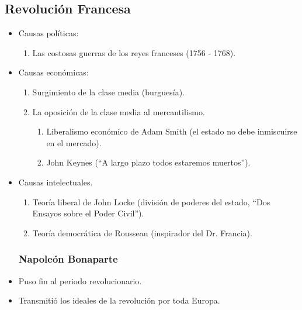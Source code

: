 \subsection{Revolución Francesa}

\begin{itemize}

\item Causas políticas:
\begin{enumerate}
	\item Las costosas guerras de los reyes franceses (1756 - 1768).
\end{enumerate}

\item Causas económicas:
\begin{enumerate}
	\item Surgimiento de la clase media (burguesía).
	\item La oposición de la clase media al mercantilismo.
	\begin{enumerate}
		\item Liberalismo económico de Adam Smith (el estado no debe inmiscuirse en el mercado).
		\item John Keynes (``A largo plazo todos estaremos muertos'').
	\end{enumerate}
\end{enumerate}

\item Causas intelectuales.
\begin{enumerate}
	\item Teoría liberal de John Locke (división de poderes del estado, ``Dos Ensayos sobre el Poder Civil'').
	\item Teoría democrática de Rousseau (inspirador del Dr. Francia).
\end{enumerate}

\subsubsection{Napoleón Bonaparte}

\item Puso fin al periodo revolucionario.
\item Transmitió los ideales de la revolución por toda Europa.

\end{itemize}